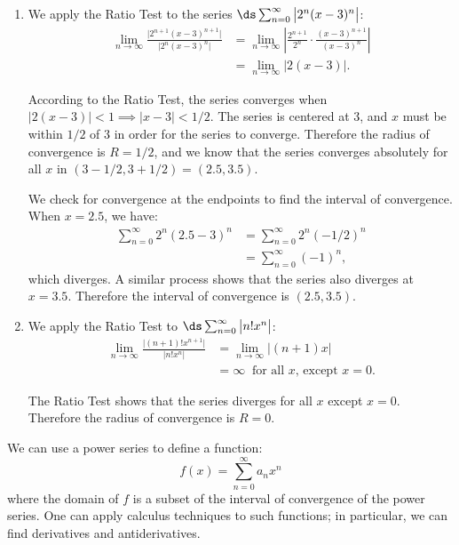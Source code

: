 {\begin{enumerate}
	\item		We apply the Ratio Test to the series $\ds\sum_{n=0}^\infty \big|2^n(x-3)^n\big|$:
	\begin{align*}
	\lim_{n\to\infty} \frac{\big| 2^{n+1}(x-3)^{n+1}\big|}{\big|2^n(x-3)^n\big|} &= \lim_{n\to\infty} \left|\frac{2^{n+1}}{2^n}\cdot\frac{(x-3)^{n+1}}{(x-3)^n}\right|\\
			&=\lim_{n\to\infty} \big|2(x-3)\big|.
	\end{align*}
	
According to the Ratio Test, the series converges when $\big|2(x-3)\big|<1 \implies \big|x-3\big| < 1/2$. The series is centered at 3, and $x$ must be within $1/2$ of 3 in order for the series to converge. Therefore the radius of convergence is $R=1/2$, and we know that the series converges absolutely for all $x$ in $(3-1/2,3+1/2) = (2.5, 3.5)$.

We check for convergence at the endpoints to find the interval of convergence. When $x=2.5$, we have:
\begin{align*}
\sum_{n=0}^\infty 2^n(2.5-3)^n &= \sum_{n=0}^\infty 2^n(-1/2)^n \\
			&=\sum_{n=0}^\infty (-1)^n,
\end{align*}
which diverges. A similar process shows that the series also diverges at $x=3.5$. Therefore the interval of convergence is $(2.5, 3.5)$.

\item		We apply the Ratio Test to $\ds \sum_{n=0}^\infty \big|n!x^n\big|$:
\begin{align*}
\lim_{n\to\infty} \frac{\big| (n+1)!x^{n+1}\big|}{\big|n!x^n\big|} &= \lim_{n\to\infty} \big|(n+1)x\big|\\
		&= \infty\ \text{ for all $x$, except $x=0$.}
\end{align*}

The Ratio Test shows that the series diverges for all $x$ except $x=0$. Therefore the radius of convergence is $R=0$.
\end{enumerate}}

We can use a power series to define a function:
$$f(x) = \sum_{n=0}^\infty a_nx^n$$
where the domain of $f$ is a subset of the interval of convergence of the power series. One can apply calculus techniques to such functions; in particular, we can find derivatives and antiderivatives. 


